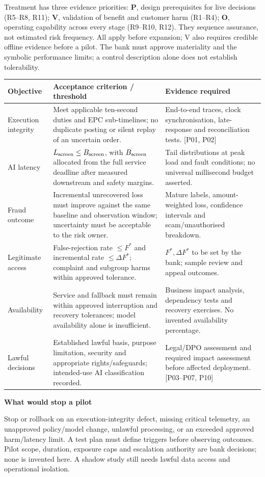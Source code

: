 \documentclass[11pt,a4paper]{article}
\newcommand{\sub}[1]{\par\vspace{2mm}\textbf{\color{ink}#1}\par}
\newcommand{\src}[1]{{\small[#1]}}
\begin{document}
Treatment has three evidence priorities: \textbf{P}, design prerequisites for live decisions (R5--R8, R11); \textbf{V}, validation of benefit and customer harm (R1--R4); \textbf{O}, operating capability across every stage (R9--R10, R12). They sequence assurance, not estimated risk frequency. All apply before expansion; V also requires credible offline evidence before a pilot. The bank must approve materiality and the symbolic performance limits; a control description alone does not establish tolerability.
\par{\small\begin{tabularx}{\textwidth}{@{}P{27mm}YP{44mm}@{}}\toprule
Objective & Acceptance criterion / threshold & Evidence required\\\midrule
Execution integrity & Meet applicable ten-second duties and EPC sub-timelines; no duplicate posting or silent replay of an uncertain order. & End-to-end traces, clock synchronisation, late-response and reconciliation tests. \src{P01, P02}\\
AI latency & $L_{\rm screen} \leq B_{\rm screen}$, with $B_{\rm screen}$ allocated from the full service deadline after measured downstream and safety margins. & Tail distributions at peak load and fault conditions; no universal millisecond budget asserted.\\
Fraud outcome & Incremental unrecovered loss must improve against the same baseline and observation window; uncertainty must be acceptable to the risk owner. & Mature labels, amount-weighted loss, confidence intervals and scam/unauthorised breakdown.\\
Legitimate access & False-rejection rate $\leq F^*$ and incremental rate $\leq\Delta F^*$; complaint and subgroup harms within approved tolerance. & $F^*,\Delta F^*$ to be set by the bank; sample review and appeal outcomes.\\
Availability & Service and fallback must remain within approved interruption and recovery tolerances; model availability alone is insufficient. & Business impact analysis, dependency tests and recovery exercises. No invented availability percentage.\\
Lawful decisions & Established lawful basis, purpose limitation, security and appropriate rights/safeguards; intended-use AI classification recorded. & Legal/DPO assessment and required impact assessment before affected deployment. \src{P03--P07, P10}\\\bottomrule
\end{tabularx}\par}
\sub{What would stop a pilot}
Stop or rollback on an execution-integrity defect, missing critical telemetry, an unapproved policy/model change, unlawful processing, or an exceeded approved harm/latency limit. A test plan must define triggers before observing outcomes. Pilot scope, duration, exposure caps and escalation authority are bank decisions; none is invented here. A shadow study still needs lawful data access and operational isolation.
\end{document}
